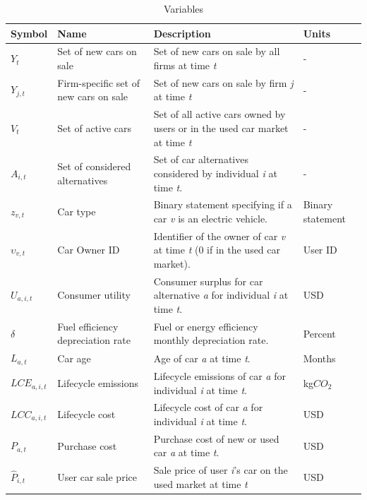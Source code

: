\documentclass[12pt]{article}
\begin{document}
	\begin{longtable}{p{}p{}p{}p{}}
		\caption{Variables}
		\label{tab:endogenous_parameters} \\
		\toprule
		\textbf{Symbol} & \textbf{Name} & \textbf{Description} & \textbf{Units} \\
		\midrule
		\endhead
		\bottomrule
		\endlastfoot
		$Y_t$ & Set of new cars on sale & Set of new cars on sale by all firms at time \textit{t} & - \\
		\hline
		$Y_{j,t}$ & Firm-specific set of new cars on sale  & Set of new cars on sale by firm \textit{j} at time \textit{t} & - \\
		\hline
		$V_t$ & Set of active cars & Set of all active cars owned by users or in the used car market at time \textit{t} & - \\
		\hline
		$A_{i,t}$ & Set of considered alternatives & Set of car alternatives considered by individual \textit{i} at time \textit{t}. & - \\
		\hline
		$z_{v,t}$ & Car type & Binary statement specifying if a car \textit{v} is an electric vehicle. & Binary statement \\
		\hline
		$\upsilon_{v,t}$ & Car Owner ID & Identifier of the owner of car \textit{v} at time \textit{t} (0 if in the used car market). &  User ID  \\
		\hline
		$U_{a,i,t}$ & Consumer utility & Consumer surplus for car alternative \textit{a} for individual \textit{i} at time \textit{t}. & USD \\
		\hline
		$\delta$ & Fuel efficiency depreciation rate & Fuel or energy efficiency monthly depreciation rate. & Percent \\
		\hline
		$L_{a,t}$ & Car age & Age of car \textit{a} at time \textit{t}. & Months \\
		\hline
		$LCE_{a,i,t}$ & Lifecycle emissions & Lifecycle emissions of car \textit{a} for individual \textit{i} at time \textit{t}. & kg$CO_2$ \\
		\hline
		$LCC_{a,i,t}$ & Lifecycle cost & Lifecycle cost of car \textit{a} for individual \textit{i} at time \textit{t}. & USD \\
		\hline
		$P_{a,t}$ & Purchase cost & Purchase cost of new or used car \textit{a} at time \textit{t}. & USD \\
		\hline
		$\hat{P}_{i,t}$ & User car sale price & Sale price of user \textit{i}'s car on the used market at time \textit{t} & USD \\
		\hline

\end{longtable}
\end{document}
